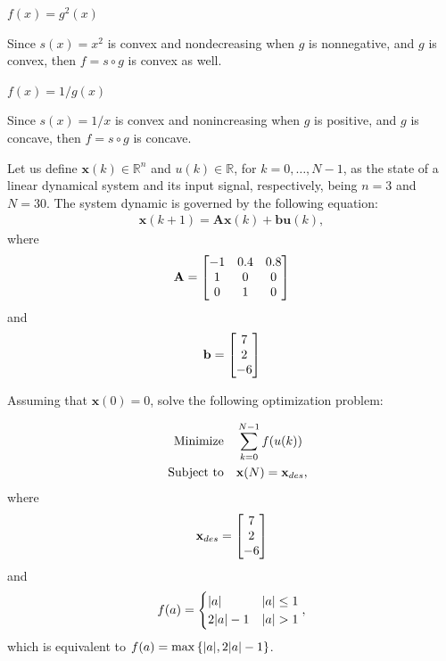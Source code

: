 \documentclass[12pt,a4paper]{article}
\begin{document}
\subproblem \(f(x) = g^2(x)\)

Since \(s(x) = x^2\) is convex and nondecreasing when \(g\) is nonnegative, and \(g\) is convex, then \(f = s \circ g\) is convex as well.

\subproblem \(f(x) = 1/g(x)\)

Since \(s(x) = 1/x\) is convex and nonincreasing when \(g\) is positive, and \(g\) is concave, then \(f = s \circ g\) is concave.

\problem

Let us define \(\mathbf{x}(k) \in \mathbb{R}^{n}\) and \(u(k) \in \mathbb{R}\), for \(k = 0, \dots, N-1\), as the state of a linear dynamical system and its input signal, respectively, being \(n = 3\) and \(N = 30\). The system dynamic is governed by the following equation:
\begin{align}
    \mathbf{x}(k+1) = \mathbf{A} \mathbf{x}(k) + \mathbf{b} \mathbf{u}(k),
\end{align}
where
\begin{align}
    \mathbf{A} = \bmqty{-1 & 0.4 & 0.8\\
           1 & 0 & 0\\
           0 & 1 & 0}
\end{align}
and
\begin{align}
    \mathbf{b} = \mqty[7\\2\\-6]
\end{align}

Assuming that \(\mathbf{x}(0) = 0\), solve the following optimization problem:

\begin{align}
    \qq{Minimize} & \sum_{k = 0}^{N-1} f(u(k))\\
    \qq{Subject to} & \mathbf{x}(N) = \mathbf{x}_{des},
\end{align}
where
\begin{align}
    \mathbf{x}_{des} = \mqty[7\\2\\-6]
\end{align}
and
\begin{align}
    f(a) = \begin{cases}
        \abs{a} & \abs{a} \leq 1 \\
        2\abs{a} - 1 & \abs{a} > 1
    \end{cases},
\end{align}
which is equivalent to \(f(a) = \max{\left\{ \abs{a}, 2\abs{a} - 1 \right\}}\).
\end{document}
